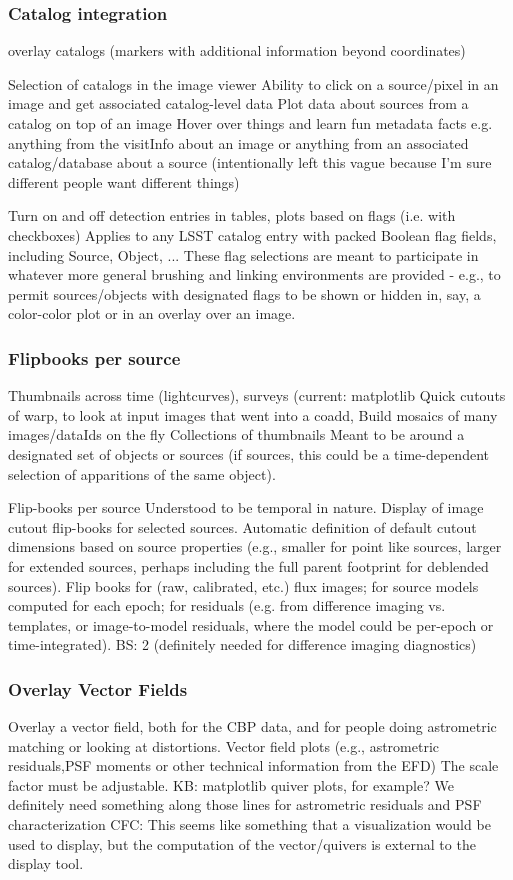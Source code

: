 \subsubsection{Catalog integration}
overlay catalogs (markers with additional information beyond coordinates)

Selection of catalogs in the image viewer
Ability to click on a source/pixel in an image and get associated catalog-level data
Plot data about sources from a catalog on top of an image
Hover over things and learn fun metadata facts
e.g. anything from the visitInfo about an image or anything from an associated catalog/database about a source (intentionally left this vague because I'm sure different people want different things)

Turn on and off detection entries in tables, plots based on flags (i.e. with checkboxes)
Applies to any LSST catalog entry with packed Boolean flag fields, including Source, Object, ...
These flag selections are meant to participate in whatever more general brushing and linking environments are provided - e.g., to permit sources/objects with designated flags to be shown or hidden in, say, a color-color plot or in an overlay over an image.

\subsubsection{Flipbooks per source}
Thumbnails across time (lightcurves), surveys  (current: matplotlib
Quick cutouts of warp, to  look at input images that went into a coadd,
Build mosaics of many images/dataIds on the fly
Collections of thumbnails
Meant to be around a designated set of objects or sources (if sources, this could be a time-dependent selection of apparitions of the same object).

Flip-books per source
Understood to be temporal in nature. Display of image cutout flip-books for selected sources. Automatic definition of default cutout dimensions based on source properties (e.g., smaller for point like sources, larger for extended sources, perhaps including the full parent footprint for deblended sources). Flip books for (raw, calibrated, etc.) flux images; for source models computed for each epoch; for residuals (e.g. from difference imaging vs. templates, or image-to-model residuals, where the model could be per-epoch or time-integrated).
BS: 2 (definitely needed for difference imaging diagnostics)

\subsubsection{Overlay Vector Fields}
Overlay a vector field, both for the CBP data, and for people doing astrometric matching or looking at distortions.
Vector field plots (e.g., astrometric residuals,PSF moments or other technical information from the EFD)
The scale factor must be adjustable.
KB: matplotlib quiver plots, for example? We definitely need something along those lines for astrometric residuals and PSF characterization
CFC: This seems like something that a visualization would be used to display, but the computation of the vector/quivers is external to the display tool.

